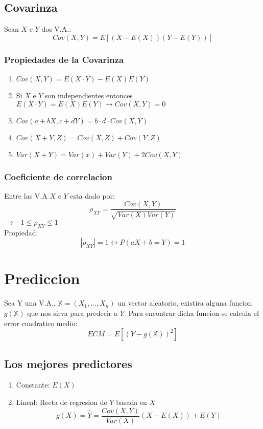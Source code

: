 \documentclass[titlepage,a4paper]{article}
\begin{document}
\subsection{Covarinza}
Sean $X$ e $Y$ dos V.A.:
\begin{equation*}
    Cov(X,Y) = E[(X-E(X))(Y-E(Y))]
\end{equation*}
\subsubsection{Propiedades de la Covarinza}
\begin{enumerate}
    \item $Cov(X,Y) = E(X \cdot Y) - E(X)E(Y)$
    \item Si $X$ e $Y$ son independientes entonces $E(X \cdot Y) = E(X)E(Y) \rightarrow Cov(X,Y)=0$
    \item $Cov(a+bX,c+dY) = b \cdot d \cdot Cov(X,Y)$ 
    \item $Cov(X+Y,Z) = Cov(X,Z)+Cov(Y,Z)$
    \item $Var(X+Y) = Var(x) + Var(Y) + 2Cov(X,Y)$
\end{enumerate}
\subsubsection{Coeficiente de correlacion}
Entre las V.A $X$ e $Y$ esta dado por:
\begin{equation*}
    \rho_{XY} = \frac{Cov(X,Y)}{\sqrt{Var(X)Var(Y)}}
\end{equation*}
$\rightarrow -1 \leq \rho_{XY} \leq 1$ \\
Propiedad: \\
\begin{equation*}
    |\rho_{XY}| = 1 \leftrightarrow P(aX+b =Y) =1 
\end{equation*}
\section{Prediccion}
Sea Y una V.A., $\mathbb{X} = (X_{1},...,X_{n})$ un vector aleatorio, existira alguna funcion $g(\mathbb{X})$ que nos 
sirva para predecir a $Y$. Para encontrar dicha funcion se calcula el error cuadratico medio:
\begin{equation*}
    ECM = E[(Y-g(\mathbb{X}))^{2}]
\end{equation*}
\subsection{Los mejores predictores}
\begin{enumerate}
    \item Constante: $E(X)$
    \item Lineal: Recta de regresion de $Y$ basada en $X$ 
    \begin{equation*}
        g(X) = \hat{Y} = \frac{Cov(X,Y)}{Var(X)}(X-E(X))+E(Y)
    \end{equation*}
\end{enumerate}
\end{document}
